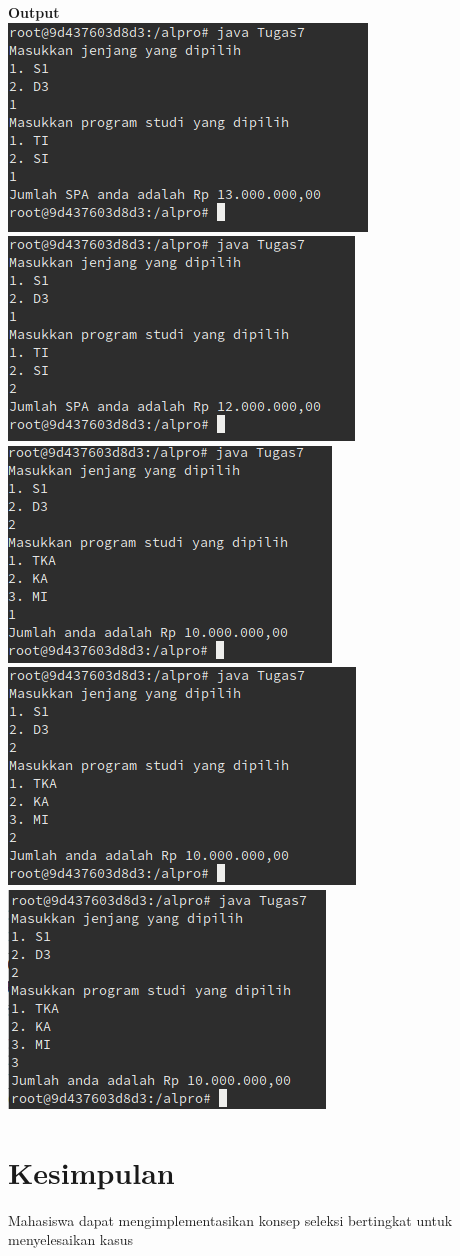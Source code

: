 \documentclass[a4paper,12pt]{article}
\begin{document}
\newpage
{\bfseries Output\\}
\includegraphics[scale=.6]{tugas-3}
\includegraphics[scale=.6]{tugas-4}
\includegraphics[scale=.6]{tugas-5}
\includegraphics[scale=.6]{tugas-6}
\includegraphics[scale=.6]{tugas-7}

\newpage
\section{Kesimpulan}
Mahasiswa dapat mengimplementasikan konsep seleksi bertingkat untuk menyelesaikan kasus
\end{document}
